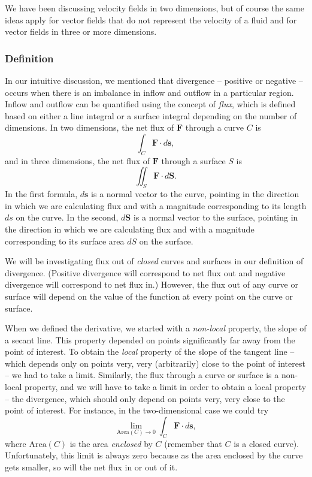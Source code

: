 \documentclass{myarticle}
\renewcommand{\vec}[1]{\mathbf{#1}}
\theoremstyle{nospace}
\newtheorem{old series theorem}{Theorem}
\newenvironment{series theorem}
{\begin{mdframed}\begin{old series theorem}}
    {\end{old series theorem}\end{mdframed}}
\begin{document}
We have been discussing velocity fields in two dimensions, but of
course the same ideas apply for vector fields that do not represent
the velocity of a fluid and for vector fields in three or more
dimensions.

\subsubsection{Definition}
\label{sec:divergence definition}

In our intuitive discussion, we mentioned that divergence -- positive
or negative -- occurs when there is an imbalance in inflow and outflow
in a particular region. Inflow and outflow can be quantified using the
concept of \textit{flux}, which is defined based on either a line
integral or a surface integral depending on the number of dimensions.
In two dimensions, the net flux of $\vec{F}$ through a curve $C$ is
\[
  \int_C \vec{F} \cdot d\vec{s},
\]
and in three dimensions, the net flux of $\vec{F}$ through a surface
$S$ is
\[
  \iint_S \vec{F} \cdot d\vec{S}.
\]
In the first formula, $d\vec{s}$ is a normal vector to the curve,
pointing in the direction in which we are calculating flux and with a
magnitude corresponding to its length $ds$ on the curve. In the
second, $d\vec{S}$ is a normal vector to the surface, pointing in the
direction in which we are calculating flux and with a magnitude
corresponding to its surface area $dS$ on the surface.

We will be investigating flux out of \textit{closed} curves and
surfaces in our definition of divergence. (Positive divergence will
correspond to net flux out and negative divergence will correspond to
net flux in.) However, the flux out of any curve or surface will
depend on the value of the function at every point on the curve or
surface.

When we defined the derivative, we started with a \textit{non-local}
property, the slope of a secant line. This property depended on points
significantly far away from the point of interest. To obtain the
\textit{local} property of the slope of the tangent line -- which
depends only on points very, very (arbitrarily) close to the point of
interest -- we had to take a limit. Similarly, the flux through a
curve or surface is a non-local property, and we will have to take a
limit in order to obtain a local property -- the divergence, which
should only depend on points very, very close to the point of
interest. For instance, in the two-dimensional case we could try
\[
  \lim_{\text{Area}(C) \to 0} \int_C \vec{F} \cdot d\vec{s},
\]
where $\text{Area}(C)$ is the area \textit{enclosed} by $C$ (remember
that $C$ is a closed curve). Unfortunately, this limit is always zero
because as the area enclosed by the curve gets smaller, so will the
net flux in or out of it.
\end{document}
